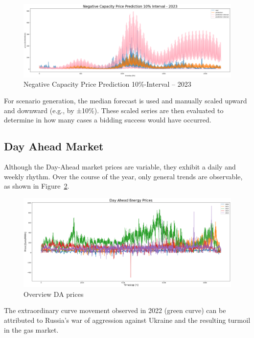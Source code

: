 \begin{figure}[H]
	\centering
	\includegraphics[width=1\linewidth]{pictures/RL/Negative Capacity Price Prediction Interval - 2023.png}
	\caption{Negative Capacity Price Prediction 10\%-Interval – 2023}
	\label{fig:Negative Capacity Price Prediction Interval - 2023}
\end{figure}

For scenario generation, the median forecast is used and manually scaled upward and downward (e.g., by ±10\%).
These scaled series are then evaluated to determine in how many cases a bidding success would have occurred.


\subsection{Day Ahead Market}

Although the Day-Ahead market prices are variable, they exhibit a daily and weekly rhythm.
Over the course of the year, only general trends are observable, as shown in Figure~\ref{fig:overviewDAprices}.

\begin{figure}[!h]
	\centering
	\includegraphics[width=1\linewidth]{pictures/overviewDAprices_year.png}
	\caption{Overview DA prices}
	\label{fig:overviewDAprices}
\end{figure}

The extraordinary curve movement observed in 2022 (green curve) can be attributed to
Russia's war of aggression against Ukraine and the resulting turmoil
in the gas market.

